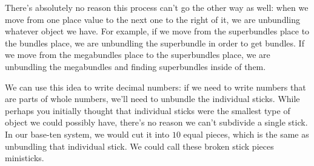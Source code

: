 \documentclass{ximera}
\begin{document}
\begin{image}
\end{image}

There's absolutely no reason this process can't go the other way as well: when we move from one place value to the next one to the right of it, we are unbundling whatever object we have. For example, if we move from the superbundles place to the bundles place, we are unbundling the superbundle in order to get bundles. If we move from the megabundles place to the superbundles place, we are unbundling the megabundles and finding superbundles inside of them. 

\begin{image}
\end{image}

We can use this idea to write decimal numbers: if we need to write numbers that are parts of whole numbers, we'll need to unbundle the individual sticks. While perhaps you initially thought that individual sticks were the smallest type of object we could possibly have, there's no reason we can't subdivide a single stick. In our base-ten system, we would cut it into $10$ equal pieces, which is the same as unbundling that individual stick. We could call these broken stick pieces ministicks.

\begin{image}
\end{image}
\end{document}

